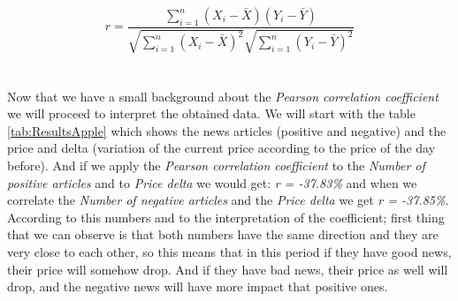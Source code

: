 \[r = \frac{\sum ^n _{i=1}(X_i - \bar{X})(Y_i - \bar{Y})}{\sqrt{\sum ^n _{i=1}(X_i - \bar{X})^2} \sqrt{\sum ^n _{i=1}(Y_i - \bar{Y})^2}}\] 
\\\\
Now that we have a small background about the \emph{Pearson correlation coefficient} we will proceed to interpret the obtained data. We will start with the table \ref{tab:ResultsApple} which shows the news articles (positive and negative) and the price and delta (variation of the current price according to the price of the day before). And if we apply the \emph{Pearson correlation coefficient} to the \emph{Number of positive articles} and to \emph{Price delta} we would get: \emph{r = -37.83\%} and when we correlate the \emph{Number of negative articles} and the \emph{Price delta} we get \emph{r = -37.85\%}. According to this numbers and to the interpretation of the coefficient; first thing that we can observe is that both numbers have the same direction and they are very close to each other, so this means that in this period if they have good news, their price will somehow drop. And if they have bad news, their price as well will drop, and the negative news will have more impact that positive ones.


